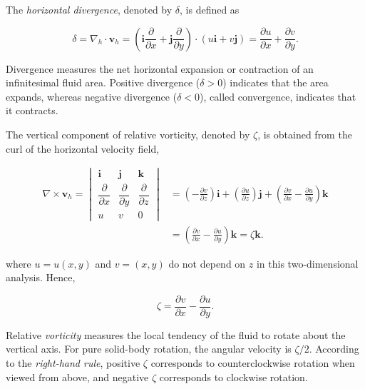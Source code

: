 \documentclass[10pt,twocolumn]{memoir}
\begin{document}
The \textit{horizontal divergence}, denoted by $\delta$, is defined as

\begin{equation}
    \delta=\nabla_h\cdot\mathbf{v}_h
    =\left(\mathbf{i}\frac{\partial}{\partial x}+\mathbf{j}\frac{\partial}{\partial y}\right)\cdot(u\mathbf{i}+v\mathbf{j})
    =\frac{\partial u}{\partial x}+\frac{\partial v}{\partial y}.
\label{eq:c1_horizontal_divergence}
\end{equation}

Divergence measures the net horizontal expansion or contraction of an infinitesimal fluid area. Positive divergence ($\delta>0$) indicates that the area expands, whereas negative divergence ($\delta<0$), called convergence, indicates that it contracts.

The vertical component of relative vorticity, denoted by $\zeta$, is obtained from the curl of the horizontal velocity field,

\begin{equation}
\begin{aligned}
    \nabla\times\mathbf{v}_h
    =\begin{vmatrix}
        \mathbf{i} & \mathbf{j} & \mathbf{k}\\
        \dfrac{\partial}{\partial x} & \dfrac{\partial}{\partial y} & \dfrac{\partial}{\partial z}\\
        u & v & 0
    \end{vmatrix} &= \left(-\frac{\partial v}{\partial z}\right)\mathbf{i} + \left(\frac{\partial u}{\partial z}\right)\mathbf{j} + \left(\frac{\partial v}{\partial x}-\frac{\partial u}{\partial y}\right)\mathbf{k}\\
    &=\left(\frac{\partial v}{\partial x}-\frac{\partial u}{\partial y}\right)\mathbf{k}
    =\zeta\mathbf{k}.
\end{aligned}
\label{eq:c1_horizontal_vorticity}
\end{equation}

where $u=u(x,y)$ and $v=(x,y)$ do not depend on $z$ in this two-dimensional analysis. Hence,

\begin{equation}
    \zeta=\frac{\partial v}{\partial x}-\frac{\partial u}{\partial y}.
\label{eq:c1_relative_vorticity}
\end{equation}

Relative \textit{vorticity} measures the local tendency of the fluid to rotate about the vertical axis. For pure solid-body rotation, the angular velocity is $\zeta/2$. According to the \textit{right-hand rule}, positive $\zeta$ corresponds to counterclockwise rotation when viewed from above, and negative $\zeta$ corresponds to clockwise rotation.
\end{document}
